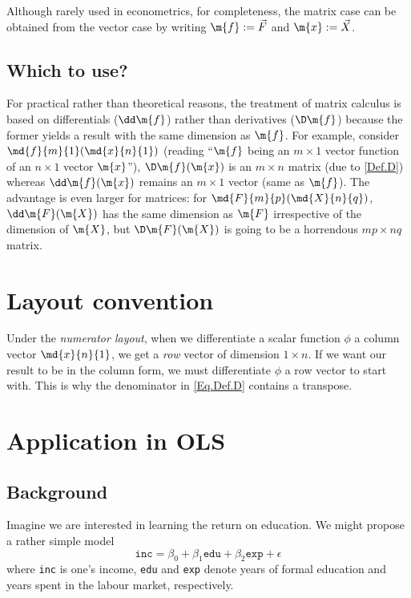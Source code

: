 Although rarely used in econometrics, for completeness, the matrix case can be obtained from the vector case by writing $\m{f}:=\vec{F}$ and $\m{x}:=\vec{X}$.

\subsection{Which to use?}

For practical rather than theoretical reasons, the treatment of matrix calculus is based on differentials ($\dd\m{f}$) rather than derivatives ($\D\m{f}$) because the former yields a result with the same dimension as $\m{f}$. For example, consider $\md{f}{m}{1}(\md{x}{n}{1})$ (reading ``$\m{f}$ being an $m\times 1$ vector function of an $n\times 1$ vector $\m{x}$''), $\D\m{f}(\m{x})$ is an $m\times n$ matrix (due to \cref{Def.D}) whereas $\dd\m{f}(\m{x})$ remains an $m\times 1$ vector (same as $\m{f}$). The advantage is even larger for matrices: for $\md{F}{m}{p}(\md{X}{n}{q})$, $\dd\m{F}(\m{X})$ has the same dimension as $\m{F}$ irrespective of the dimension of $\m{X}$, but $\D\m{F}(\m{X})$ is going to be a horrendous $mp\times nq$ matrix.

\section{Layout convention}\label{S.layout}

Under the \emph{numerator layout}, when we differentiate a scalar function $\phi$ \wrt a column vector $\md{x}{n}{1}$, we get a \emph{row} vector of dimension $1\times n$. If we want our result to be in the column form, we must differentiate $\phi$ \wrt a row vector to start with. This is why the denominator in \cref{Eq.Def.D} contains a transpose.

\section{Application in OLS}

\subsection{Background}

Imagine we are interested in learning the return on education. We might propose a rather simple model
\begin{equation}
  \texttt{inc}=\beta_0+\beta_1\texttt{edu}+\beta_2\texttt{exp}+\epsilon
\end{equation}
where \texttt{inc} is one's income, \texttt{edu} and \texttt{exp} denote years of formal education and years spent in the labour market, respectively.

